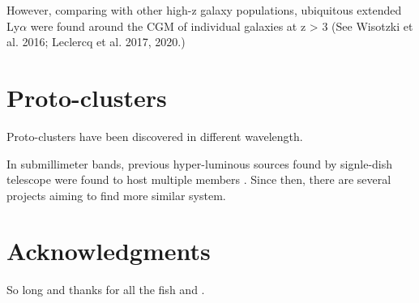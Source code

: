\documentclass{astronotes/astronotes} %
\begin{document}
However, comparing with other high-z galaxy populations, ubiquitous extended Ly$\alpha$ were found around the CGM of individual galaxies at z > 3 (See Wisotzki et al. 2016; Leclercq et al. 2017, 2020.)


\section{Proto-clusters}
Proto-clusters have been discovered in different wavelength. 

In submillimeter bands, previous hyper-luminous sources found by signle-dish telescope were found to host multiple members \citep{Oteo2018, Miller2018}. 
Since then, there are several projects aiming to find more similar system.


\section*{Acknowledgments} %


So long and thanks for all the fish \citet{Oteo2018} and \citet{Miller2018}.
\cite{}


%







\end{document}
